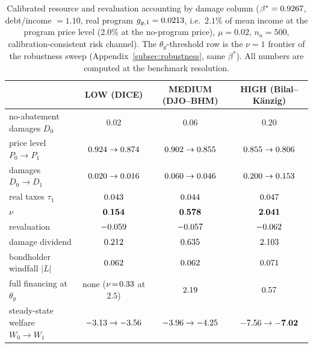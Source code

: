 \documentclass[12pt]{article}
\begin{document}
\begin{table}[!htb]
\centering
\caption{Calibrated resource and revaluation accounting by damage column
($\beta^{*}=0.9267$, debt/income $=1.10$, real program
$g_{g,1}=0.0213$, i.e.\ $2.1\%$ of mean income at the program price level
($2.0\%$ at the no-program price), $\mu=0.02$, $n_a=500$,
calibration-consistent risk channel). The
$\theta_g$-threshold row is the $\nu=1$ frontier of the robustness sweep
(Appendix~\ref{subsec:robustness}, same $\beta^{*}$). All numbers are
computed at the benchmark resolution.}
\label{tab:calibrated}
\footnotesize
\setlength{\tabcolsep}{4pt}
\begin{tabular}{lccc}
\toprule
 & LOW (DICE) & MEDIUM (DJO--BHM) & HIGH (Bilal--K\"anzig) \\
\midrule
no-abatement damages $D_0$    & 0.02   & 0.06   & 0.20 \\
price level $P_0 \to P_1$     & $0.924 \to 0.874$ & $0.902 \to 0.855$ & $0.855 \to 0.806$ \\
damages $D_0 \to D_1$         & $0.020 \to 0.016$ & $0.060 \to 0.046$ & $0.200 \to 0.153$ \\
real taxes $\tau_1$           & $0.043$  & $0.044$  & $0.047$ \\
\midrule
$\nu$                          & $\mathbf{0.154}$ & $\mathbf{0.578}$ & $\mathbf{2.041}$ \\
\quad revaluation              & $-0.059$ & $-0.057$ & $-0.062$ \\
\quad damage dividend          & $0.212$  & $0.635$  & $2.103$ \\
bondholder windfall $|L|$      & $0.062$  & $0.062$  & $0.071$ \\
full financing at $\theta_g$   & none ($\nu\!=\!0.33$ at $2.5$) & $2.19$ & $0.57$ \\
steady-state welfare $W_0 \to W_1$ & $-3.13 \to -3.56$ & $-3.96 \to -4.25$ & $-7.56 \to \mathbf{-7.02}$ \\
\bottomrule
\end{tabular}
\end{table}
\end{document}
